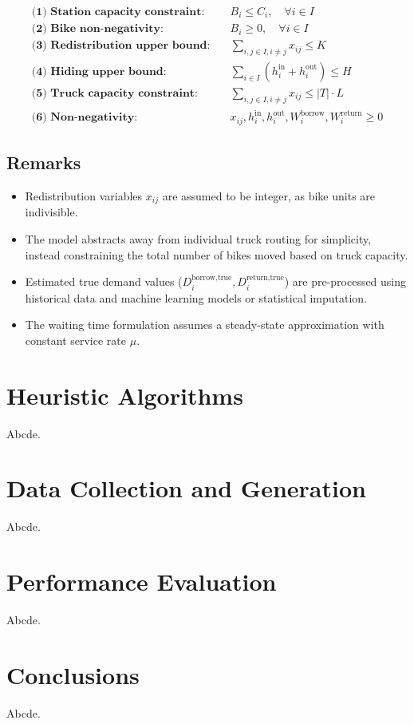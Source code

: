 \documentclass[11pt,a4paper]{article}
\begin{document}
\begin{align*}
\textbf{(1) Station capacity constraint:} & \quad B_i \leq C_i, \quad \forall i \in I \\
\textbf{(2) Bike non-negativity:} & \quad B_i \geq 0, \quad \forall i \in I \\
\textbf{(3) Redistribution upper bound:} & \quad \sum_{i,j \in I, i \ne j} x_{ij} \leq K \\
\textbf{(4) Hiding upper bound:} & \quad \sum_{i \in I} \left(h_i^{\text{in}} + h_i^{\text{out}}\right) \leq H \\
\textbf{(5) Truck capacity constraint:} & \quad \sum_{i,j \in I, i \ne j} x_{ij} \leq |T| \cdot L \\
\textbf{(6) Non-negativity:} & \quad x_{ij}, h_i^{\text{in}}, h_i^{\text{out}}, W_i^{\text{borrow}}, W_i^{\text{return}} \geq 0
\end{align*}

\subsection*{Remarks}

\begin{itemize}
    \item Redistribution variables $x_{ij}$ are assumed to be integer, as bike units are indivisible.
    \item The model abstracts away from individual truck routing for simplicity, instead constraining the total number of bikes moved based on truck capacity.
    \item Estimated true demand values ($D_i^{\text{borrow,true}}, D_i^{\text{return,true}}$) are pre-processed using historical data and machine learning models or statistical imputation.
    \item The waiting time formulation assumes a steady-state approximation with constant service rate $\mu$.
\end{itemize}




\section{Heuristic Algorithms}

Abcde.

\section{Data Collection and Generation}

Abcde.

\section{Performance Evaluation}

Abcde.

\section{Conclusions}

Abcde.

\vspace{0.5em}
\end{document}
